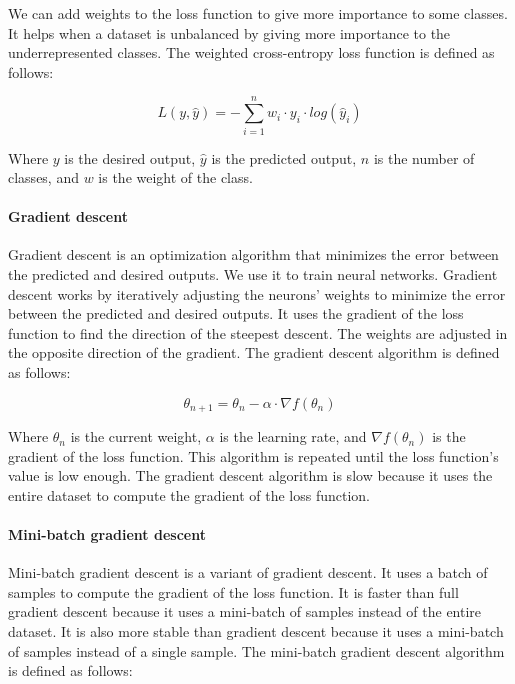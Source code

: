 We can add weights to the loss function to give more importance to some classes. It helps when a dataset is unbalanced by giving more importance to the underrepresented classes. The weighted cross-entropy loss function is defined as follows:

\begin{equation}
    L(y, \hat{y}) = - \sum_{i=1}^{n} w_{i} \cdot y_{i} \cdot log(\hat{y}_{i})
\end{equation}

Where $y$ is the desired output, $\hat{y}$ is the predicted output, $n$ is the number of classes, and $w$ is the weight of the class.

\paragraph{Gradient descent}

Gradient descent is an optimization algorithm that minimizes the error between the predicted and desired outputs. We use it to train neural networks. Gradient descent works by iteratively adjusting the neurons' weights to minimize the error between the predicted and desired outputs. It uses the gradient of the loss function to find the direction of the steepest descent. The weights are adjusted in the opposite direction of the gradient. The gradient descent algorithm is defined as follows:

\begin{equation}
    \theta_{n+1} = \theta_{n} - \alpha \cdot \nabla f(\theta_{n})
\end{equation}

Where $\theta_{n}$ is the current weight, $\alpha$ is the learning rate, and $\nabla f(\theta_{n})$ is the gradient of the loss function. This algorithm is repeated until the loss function's value is low enough. The gradient descent algorithm is slow because it uses the entire dataset to compute the gradient of the loss function.

\paragraph{Mini-batch gradient descent}

Mini-batch gradient descent is a variant of gradient descent. It uses a batch of samples to compute the gradient of the loss function. It is faster than full gradient descent because it uses a mini-batch of samples instead of the entire dataset. It is also more stable than gradient descent because it uses a mini-batch of samples instead of a single sample. The mini-batch gradient descent algorithm is defined as follows:

